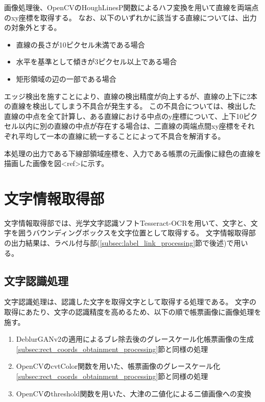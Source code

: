 画像処理後、OpenCVのHoughLinesP関数によるハフ変換を用いて直線を両端点のxy座標を取得する。
なお、以下のいずれかに該当する直線については、出力の対象外とする。

\begin{itemize}
    \item 直線の長さが10ピクセル未満である場合
    \item 水平を基準として傾きが3ピクセル以上である場合
    \item 矩形領域の辺の一部である場合
\end{itemize}

エッジ検出を施すことにより、直線の検出精度が向上するが、直線の上下に2本の直線を検出してしまう不具合が発生する。
この不具合については、検出した直線の中点を全て計算し、ある直線における中点のy座標について、上下10ピクセル以内に別の直線の中点が存在する場合は、二直線の両端点間xy座標をそれぞれ平均して一本の直線に統一することによって不具合を解消する。

本処理の出力である下線部領域座標を、入力である帳票の元画像に緑色の直線を描画した画像を図<ref>に示す。




\section{文字情報取得部}\label{sec:OCR_part}
文字情報取得部では、光学文字認識ソフトTesseract-OCRを用いて、文字と、文字を囲うバウンディングボックスを文字位置として取得する。
文字情報取得部の出力結果は、ラベル付与部(\ref{subsec:label_link_processing}節で後述)で用いる。

\subsection{文字認識処理}\label{subsec:char_recognition_processing}
文字認識処理は、認識した文字を取得文字として取得する処理である。
文字の取得にあたり、文字の認識精度を高めるため、以下の順で帳票画像に画像処理を施す。

\begin{enumerate}
    \item DeblurGANv2の適用によるブレ除去後のグレースケール化帳票画像の生成\\
        \ref{subsec:rect_coords_obtainment_processing}節と同様の処理
    \item OpenCVのcvtColor関数を用いた、帳票画像のグレースケール化\\
        \ref{subsec:rect_coords_obtainment_processing}節と同様の処理
    \item OpenCVのthreshold関数を用いた、大津の二値化による二値画像への変換\\
\end{enumerate}

